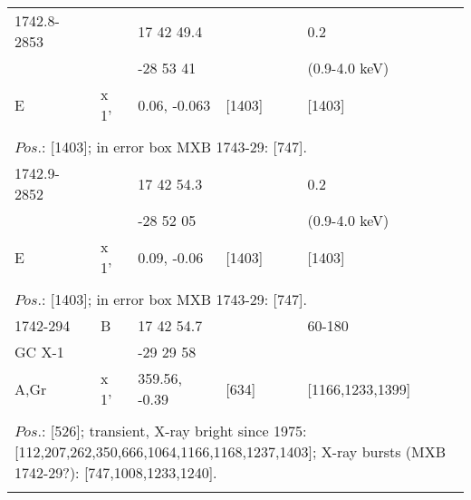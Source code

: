 \documentclass{aa}
\begin{document}
\begin{tabular}{p{2.5cm}p{1cm}p{1.8cm}p{2.3cm}p{3.3cm}p{2.0cm}p{2.2cm}}
\noalign{\smallskip}
1742.8-2853   &            & 17 42 49.4         &                         &                           & 0.2                     &          \\
                          &            & -28 53 41          &                         &                            & (0.9-4.0 keV)   &         \\
E                       & x 1'     & 0.06, -0.063      &  [1403]            &                           & [1403]               &         \\
\\
\multicolumn{7}{p{17.5cm}}{
$Pos$.: [1403]; in error box MXB 1743-29: [747].}\\
\noalign{\smallskip}
\hline

\noalign{\smallskip}
1742.9-2852  &                & 17 42 54.3            &                    &                          & 0.2                      &          \\
                         &                & -28 52 05             &                     &                          & (0.9-4.0 keV)    &         \\
E                      & x 1'         & 0.09, -0.06           & [1403]         &                          & [1403]                &         \\
\\
\multicolumn{7}{p{17.5cm}}{
$Pos$.: [1403]; in error box MXB 1743-29: [747].}\\
\noalign{\smallskip}
\hline

\noalign{\smallskip}
1742-294         & B            & 17 42 54.7           &                    &                             & 60-180                       &          \\
GC X-1             &               & -29 29 58              &                   &                             &                                     &         \\
A,Gr                 & x 1'        & 359.56, -0.39        & [634]         &                             & [1166,1233,1399]    &          \\
\\
\multicolumn{7}{p{17.5cm}}{
$Pos$.: [526]; transient, X-ray bright since 1975: [112,207,262,350,666,1064,1166,1168,1237,1403]; X-ray bursts 
(MXB 1742-29?): [747,1008,1233,1240].}\\
\noalign{\smallskip}
\hline


\end{tabular}
\end{document}
